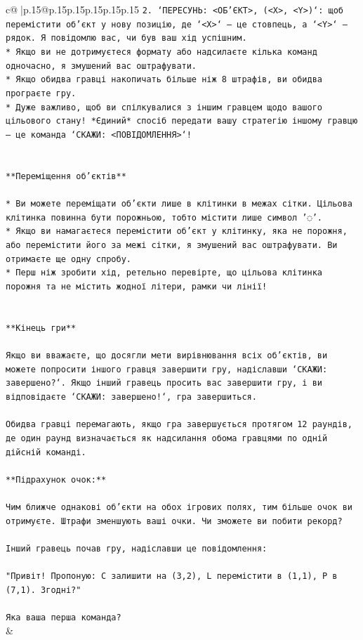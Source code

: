 \documentclass{article}
\begin{document}
{\begin{supertabular}{c@{$\;$}|p{.15\linewidth}@{}p{.15\linewidth}p{.15\linewidth}p{.15\linewidth}p{.15\linewidth}p{.15\linewidth}}
{{{\texttt{2. `ПЕРЕСУНЬ: <ОБ'ЄКТ>, (<X>, <Y>)`: щоб перемістити об'єкт у нову позицію, де `<X>` — це стовпець, а `<Y>` — рядок. Я повідомлю вас, чи був ваш хід успішним.} \\
\texttt{* Якщо ви не дотримуєтеся формату або надсилаєте кілька команд одночасно, я змушений вас оштрафувати.} \\
\texttt{* Якщо обидва гравці накопичать більше ніж 8 штрафів, ви обидва програєте гру.} \\
\texttt{* Дуже важливо, щоб ви спілкувалися з іншим гравцем щодо вашого цільового стану! *Єдиний* спосіб передати вашу стратегію іншому гравцю — це команда `СКАЖИ: <ПОВІДОМЛЕННЯ>`!} \\
\\ 
\\ 
\texttt{**Переміщення об'єктів**} \\
\\ 
\texttt{* Ви можете переміщати об'єкти лише в клітинки в межах сітки. Цільова клітинка повинна бути порожньою, тобто містити лише символ '◌'.} \\
\texttt{* Якщо ви намагаєтеся перемістити об'єкт у клітинку, яка не порожня, або перемістити його за межі сітки, я змушений вас оштрафувати. Ви отримаєте ще одну спробу.} \\
\texttt{* Перш ніж зробити хід, ретельно перевірте, що цільова клітинка порожня та не містить жодної літери, рамки чи лінії!} \\
\\ 
\\ 
\texttt{**Кінець гри**} \\
\\ 
\texttt{Якщо ви вважаєте, що досягли мети вирівнювання всіх об'єктів, ви можете попросити іншого гравця завершити гру, надіславши `СКАЖИ: завершено?`. Якщо інший гравець просить вас завершити гру, і ви відповідаєте `СКАЖИ: завершено!`, гра завершиться.} \\
\\ 
\texttt{Обидва гравці перемагають, якщо гра завершується протягом 12 раундів, де один раунд визначається як надсилання обома гравцями по одній дійсній команді.} \\
\\ 
\texttt{**Підрахунок очок:**} \\
\\ 
\texttt{Чим ближче однакові об'єкти на обох ігрових полях, тим більше очок ви отримуєте. Штрафи зменшують ваші очки. Чи зможете ви побити рекорд?} \\
\\ 
\texttt{Інший гравець почав гру, надіславши це повідомлення:} \\
\\ 
\texttt{"Привіт! Пропоную: C залишити на (3,2), L перемістити в (1,1), P в (7,1). Згодні?"} \\
\\ 
\texttt{Яка ваша перша команда?} \\
            }
        }
    }
    & \\ \\


\end{supertabular}}
\end{document}
